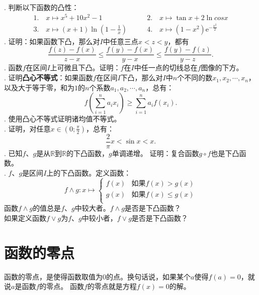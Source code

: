 \documentclass[12pt,UTF8]{ctexbook}
\begin{document}
\begin{xt}
    \mbox{} \\
    . 判断以下函数的凸性：
    $$
    \begin{array}{ll}
        1. \quad x \mapsto x^5 + 10x^2 - 1 \qquad &2. \quad x \mapsto \tan{x} + 2\ln{cos{x}} \\
        3. \quad x \mapsto (x+1)\ln{\left(1 - \frac{1}{x}\right)} \qquad &4. \quad x \mapsto \left(1 - x^2\right)\mathrm{e}^{-\frac{x^2}{2}}
    \end{array}
    $$
    . 证明：如果函数下凸，那么对$I$中任意三点$x < z < y$，都有
    $$ \frac{f(z) - f(x)}{z - x} \leqslant \frac{f(y) - f(x)}{y - x}  \leqslant \frac{f(y) - f(z)}{y - z}. $$
    . 函数$f$在区间$I$上可微且下凸。证明：$f$在$I$中任一点的切线总在$f$图像的下方。\\
    . 证明\textbf{凸心不等式}：如果函数$f$在区间$I$下凸，那么对$I$中$n$个不同的数$x_1, x_2, \cdots , x_n$，
    以及大于等于零，和为$1$的$n$个系数$a_1, a_2, \cdots, a_n$，总有：
    $$ f\left(\sum_{i=1}^n a_i x_i\right) \geqslant \sum_{i=1}^n a_i f(x_i). $$
    . 使用凸心不等式证明诸均值不等式。\\
    . 证明，对任意$x\in\left(0; \frac{\pi}{2}\right)$，总有：
    $$ \frac{2}{\pi} x < \sin{x} < x.$$
    . 已知$f$、$g$是从$\mathbb{R}$到$\mathbb{R}$的下凸函数，$g$单调递增。
    证明：复合函数$g\circ f$也是下凸函数。\\
    . $f$、$g$是区间$I$上的下凸函数。定义函数：
    $$ f \wedge g : x \mapsto \left\{
        \begin{array}{cl}
            f(x) & \mbox{如果} f(x) > g(x) \\
            g(x) & \mbox{如果} f(x) \leqslant g(x) \\
        \end{array}
    \right.
    $$
    \indent 函数$f \wedge g$的值总是$f$、$g$中较大者。$f \wedge g$是否是下凸函数？\\
    \indent 如果定义函数$f \vee g$为$f$、$g$中较小者，$f \vee g$是否是下凸函数？

\end{xt}

\section{函数的零点}

函数的零点，是使得函数取值为$0$的点。换句话说，如果某个$a$使得$f(a) = 0$，就说$a$是函数$f$的零点。
函数$f$的零点就是方程$f(x) = 0$的解。
\end{document}
